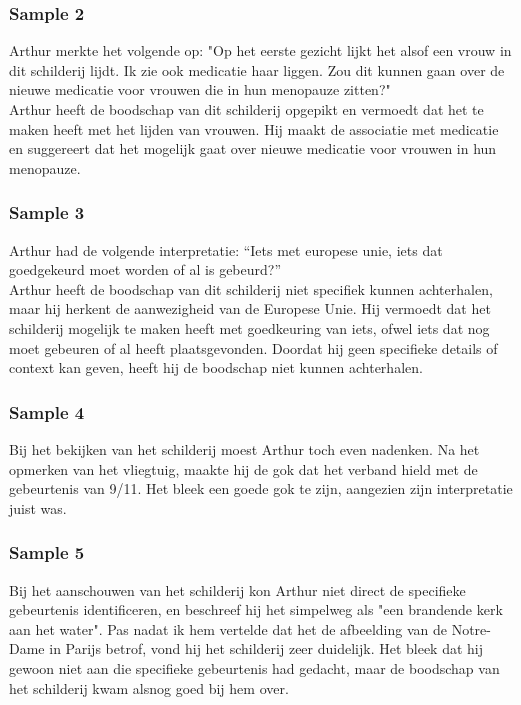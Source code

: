 \subsubsection{Sample 2}
Arthur merkte het volgende op: "Op het eerste gezicht lijkt het alsof een vrouw in dit schilderij lijdt. Ik zie ook medicatie haar liggen. Zou dit kunnen gaan over de nieuwe medicatie voor vrouwen die in hun menopauze zitten?" \\

Arthur heeft de boodschap van dit schilderij opgepikt en vermoedt dat het te maken heeft met het lijden van vrouwen. Hij maakt de associatie met medicatie en suggereert dat het mogelijk gaat over nieuwe medicatie voor vrouwen in hun menopauze. 

\subsubsection{Sample 3}
Arthur had de volgende interpretatie: ``Iets met europese unie, iets dat goedgekeurd moet worden of al is gebeurd?'' \\

Arthur heeft de boodschap van dit schilderij niet specifiek kunnen achterhalen, maar hij herkent de aanwezigheid van de Europese Unie. Hij vermoedt dat het schilderij mogelijk te maken heeft met goedkeuring van iets, ofwel iets dat nog moet gebeuren of al heeft plaatsgevonden. Doordat hij geen specifieke details of context kan geven, heeft hij de boodschap niet kunnen achterhalen. 

\subsubsection{Sample 4}
Bij het bekijken van het schilderij moest Arthur toch even nadenken. Na het opmerken van het vliegtuig, maakte hij de gok dat het verband hield met de gebeurtenis van 9/11. Het bleek een goede gok te zijn, aangezien zijn interpretatie juist was.

\subsubsection{Sample 5}
Bij het aanschouwen van het schilderij kon Arthur niet direct de specifieke gebeurtenis identificeren, en beschreef hij het simpelweg als "een brandende kerk aan het water". Pas nadat ik hem vertelde dat het de afbeelding van de Notre-Dame in Parijs betrof, vond hij het schilderij zeer duidelijk. Het bleek dat hij gewoon niet aan die specifieke gebeurtenis had gedacht, maar de boodschap van het schilderij kwam alsnog goed bij hem over.

